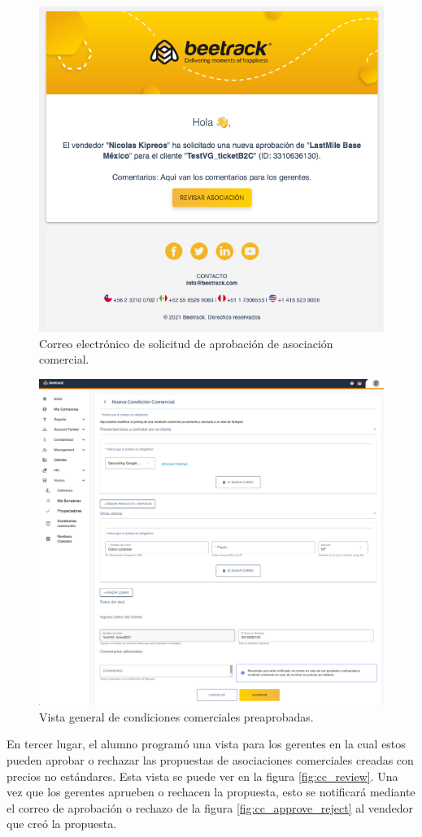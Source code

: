     \begin{figure}[H]
      \centering
      \includegraphics[width=0.6\linewidth]{figures/cc/mails/cc_mail_new.png}
      \caption{Correo electrónico de solicitud de aprobación de asociación comercial.}
      \label{fig:cc_mail_new}
    \end{figure}

    \begin{figure}[H]
      \centering
      \includegraphics[width=0.6\linewidth]{figures/cc/vistas/cc_new_sales_man.png}
      \caption{Vista general de condiciones comerciales preaprobadas.}
      \label{fig:cc_new_sales_man}
    \end{figure}

    En tercer lugar, el alumno programó una vista para los gerentes en la cual estos pueden aprobar o rechazar las propuestas de asociaciones comerciales creadas con precios no estándares. Esta vista se puede ver en la figura \ref{fig:cc_review}. Una vez que los gerentes aprueben o rechacen la propuesta, esto se notificará mediante el correo de aprobación o rechazo de la figura \ref{fig:cc_approve_reject} al vendedor que creó la propuesta.

